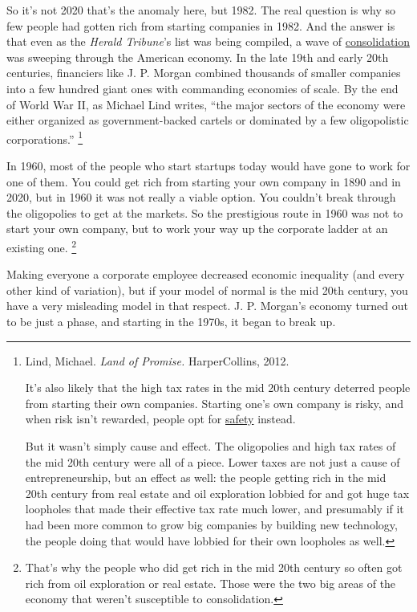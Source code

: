 \documentclass[12pt]{book}
\begin{document}
So it's not 2020 that's the anomaly here, but 1982. The real question is
why so few people had gotten rich from starting companies in 1982. And
the answer is that even as the \emph{Herald Tribune}'s list was being
compiled, a wave of \href{re.html}{consolidation} was sweeping through
the American economy. In the late 19th and early 20th centuries,
financiers like J. P. Morgan combined thousands of smaller companies
into a few hundred giant ones with commanding economies of scale. By the
end of World War II, as Michael Lind writes, ``the major sectors of the
economy were either organized as government-backed cartels or dominated
by a few oligopolistic corporations.'' \footnote{Lind, Michael. \emph{Land of Promise.} HarperCollins, 2012.

It's also likely that the high tax rates in the mid 20th century
deterred people from starting their own companies. Starting one's own
company is risky, and when risk isn't rewarded, people opt for
\href{inequality.html}{safety} instead.

But it wasn't simply cause and effect. The oligopolies and high tax
rates of the mid 20th century were all of a piece. Lower taxes are not
just a cause of entrepreneurship, but an effect as well: the people
getting rich in the mid 20th century from real estate and oil
exploration lobbied for and got huge tax loopholes that made their
effective tax rate much lower, and presumably if it had been more common
to grow big companies by building new technology, the people doing that
would have lobbied for their own loopholes as well.}

In 1960, most of the people who start startups today would have gone to
work for one of them. You could get rich from starting your own company
in 1890 and in 2020, but in 1960 it was not really a viable option. You
couldn't break through the oligopolies to get at the markets. So the
prestigious route in 1960 was not to start your own company, but to work
your way up the corporate ladder at an existing one.
\footnote{That's why the people who did get rich in the mid 20th century
so often got rich from oil exploration or real estate. Those were the
two big areas of the economy that weren't susceptible to consolidation.}

Making everyone a corporate employee decreased economic inequality (and
every other kind of variation), but if your model of normal is the mid
20th century, you have a very misleading model in that respect. J. P.
Morgan's economy turned out to be just a phase, and starting in the
1970s, it began to break up.
\end{document}
